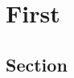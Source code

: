 \documentclass[ebook, oneside]{memoir}
\begin{document}


\chapter{First}
\lipsum[2-10]
\section{Section}
\end{document}
